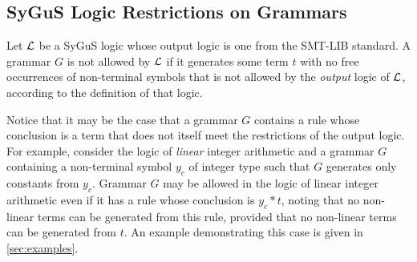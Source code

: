 \documentclass[english,a4paper,10pt]{article}
\begin{document}


\subsection{SyGuS Logic Restrictions on Grammars}
\label{ssec:logicr-grammars}

Let $\mathcal{L}$ be a SyGuS logic whose output logic
is one from the SMT-LIB standard.
A grammar $G$ is not allowed by $\mathcal{L}$ if
it generates some term $t$ with 
no free occurrences of non-terminal
symbols that is not allowed by the \emph{output} logic of $\mathcal{L}$,
according to the definition of that logic. %

Notice that it may be the case that a grammar $G$
contains a rule whose conclusion is a term 
that does not itself meet the restrictions 
of the output logic.
For example, consider the logic of \emph{linear} integer arithmetic
and a grammar $G$ containing a non-terminal symbol $y_c$ of integer type
such that $G$ generates only constants from $y_c$.
Grammar $G$ may be allowed in the logic of linear integer arithmetic
even if it has a rule whose conclusion is $y_c * t$, 
noting that no non-linear terms can be generated from this rule,
provided that no non-linear terms can be generated from $t$.
An example demonstrating this case is given in \cref{sec:examples}.
\end{document}

